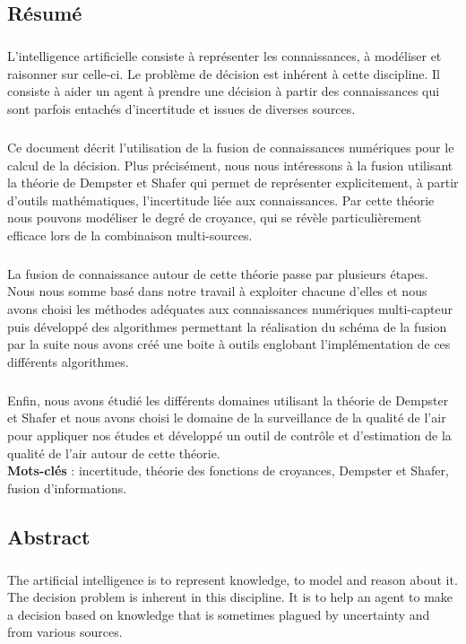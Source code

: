 \documentclass[a4paper, 12pt]{report}
\begin{document}
\begin{center}
\section*{Résumé}
\end{center}
\thispagestyle{empty}
\subparagraph{}
L'intelligence artificielle consiste à représenter les connaissances, à modéliser et raisonner sur celle-ci. Le problème de décision est inhérent à cette discipline. Il consiste à aider un agent à prendre une décision à partir des connaissances qui sont parfois entachés d'incertitude et issues de diverses sources. 
\subparagraph{}
Ce document décrit l'utilisation de la fusion de connaissances numériques pour le calcul de la décision. Plus précisément, nous nous intéressons à la fusion utilisant la théorie de Dempster et Shafer qui permet de représenter explicitement, à partir d'outils mathématiques, l'incertitude liée aux connaissances. Par cette théorie nous pouvons modéliser le degré de croyance, qui se révèle particulièrement efficace lors de la combinaison multi-sources.
\subparagraph{}
La fusion de connaissance autour de cette théorie passe par plusieurs étapes. Nous nous somme basé dans notre travail à exploiter chacune d'elles et nous avons choisi les méthodes adéquates aux connaissances numériques multi-capteur puis développé des algorithmes permettant la réalisation du schéma de la fusion par la suite  nous avons créé une boite à outils englobant l'implémentation  de ces différents algorithmes. 
\subparagraph{}
Enfin, nous avons étudié les différents domaines utilisant la théorie de Dempster et Shafer et nous avons choisi le domaine de la surveillance de la qualité de l'air pour appliquer nos études  et développé un outil de contrôle et d'estimation de la qualité de l'air autour de cette théorie.
\\
\textbf{   Mots-clés} : incertitude, théorie des fonctions de croyances, Dempster et Shafer, fusion d'informations.
\begin{center}
\section*{Abstract}
\end{center}
\subparagraph{}
The artificial intelligence is to represent knowledge, to model and reason about it. The decision problem is inherent in this discipline. It is to help an agent to make a decision based on knowledge that is sometimes plagued by uncertainty and from various sources.
\subparagraph{}
\end{document}
